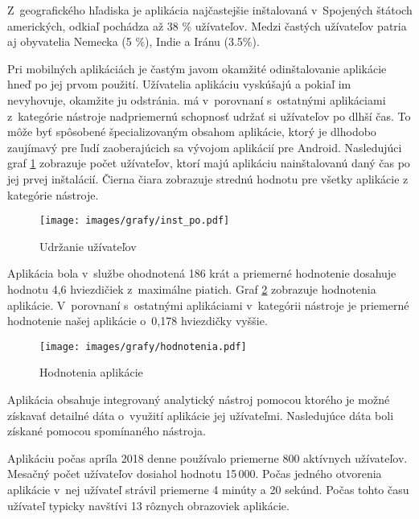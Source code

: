 Z~geografického hľadiska je aplikácia najčastejšie inštalovaná v~Spojených štátoch amerických, odkiaľ pochádza až 38 \% užívateľov. Medzi častých užívateľov patria aj obyvatelia Nemecka (5 \%), Indie a Iránu (3.5\%). 

Pri mobilných aplikáciách je častým javom okamžité odinštalovanie aplikácie hneď po jej prvom použití. Užívatelia aplikáciu vyskúšajú a pokiaľ im nevyhovuje, okamžite ju odstránia.  má v~porovnaní s~ostatnými aplikáciami z~kategórie nástroje nadpriemernú schopnosť udržať si užívateľov po dlhší čas. To môže byť spôsobené špecializovaným obsahom aplikácie, ktorý je dlhodobo zaujímavý pre ľudí zaoberajúcich sa vývojom aplikácií pre Android. Nasledujúci graf \ref{fig:inst-po} zobrazuje počet užívateľov, ktorí majú aplikáciu nainštalovanú daný čas po jej prvej inštalácií. Čierna čiara zobrazuje strednú hodnotu pre všetky aplikácie z kategórie nástroje. 

\begin{figure}[H]
  \begin{center}
    \texttt{[image: images/grafy/inst\_po.pdf]}
  \end{center}
  \caption{Udržanie užívateľov}
  \label{fig:inst-po}
\end{figure}


Aplikácia bola v~službe  ohodnotená 186 krát a priemerné hodnotenie dosahuje hodnotu 4,6 hviezdičiek z~maximálne piatich. Graf \ref{fig:hodnotenia} zobrazuje hodnotenia aplikácie. V~porovnaní s~ostatnými aplikáciami v~kategórii nástroje je priemerné hodnotenie našej aplikácie o~0,178 hviezdičky vyššie.

\begin{figure}[htb]
  \begin{center}
    \texttt{[image: images/grafy/hodnotenia.pdf]}
  \end{center}
  \caption{Hodnotenia aplikácie}
  \label{fig:hodnotenia}
\end{figure}


Aplikácia obsahuje integrovaný analytický nástroj  pomocou ktorého je možné získavať detailné dáta o~využití aplikácie jej užívateľmi. Nasledujúce dáta boli získané pomocou spomínaného nástroja.

Aplikáciu počas apríla 2018 denne používalo priemerne 800 aktívnych užívateľov. Mesačný počet užívateľov dosiahol hodnotu 15\,000. Počas jedného otvorenia aplikácie v~nej užívateľ strávil priemerne 4 minúty a 20 sekúnd. Počas tohto času užívateľ typicky navštívi 13 rôznych obrazoviek aplikácie. 

